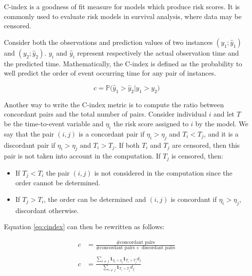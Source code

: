 \documentclass[
]{book}
\providecommand{\tightlist}{%
  \setlength{\itemsep}{0pt}\setlength{\parskip}{0pt}}
\begin{document}
C-index is a goodness of fit measure for models which produce risk scores. It is commonly used to evaluate risk models in survival analysis, where data may be censored.

Consider both the observations and prediction values of two instances \((y_1; \hat{y}_1)\) and \((y_2; \hat{y}_2)\). \(y_i\) and \(\hat{y}_i\) represent respectively the actual observation time and the predicted time. Mathematically, the C-index is defined as the probability to well predict the order of event occurring time for any pair of instances.

\begin{equation}
  c = \mathbb{P}\big(\hat{y}_1 > \hat{y}_2 | y_1 > y_2\big)
  \label{eq:cindex}
\end{equation}

Another way to write the C-index metric is to compute the ratio between concordant pairs and the total number of pairs. Consider individual \(i\) and let \(T\) be the time-to-event variable and \(\eta_i\) the risk score assigned to \(i\) by the model. We say that the pair \((i, j)\) is a concordant pair if \(\eta_i > \eta_j\) and \(T_i < T_j\), and it is a discordant pair if \(\eta_i > \eta_j\) and \(T_i > T_j\). If both \(T_i\) and \(T_j\) are censored, then this pair is not taken into account in the computation. If \(T_j\) is censored, then:

\begin{itemize}
\tightlist
\item
  If \(T_j < T_i\) the pair \((i, j)\) is not considered in the computation since the order cannot be determined.
\item
  If \(T_j > T_i\), the order can be determined and \((i, j)\) is concordant if \(\eta_i > \eta_j\), discordant otherwise.
\end{itemize}

Equation \eqref{eq:cindex} can then be rewritten as follows:

\begin{equation}
\begin{aligned}
c & = \frac{\# \text{concordant pairs}}{\# \text{concordant pairs} + \ \text{discordant pairs}} \\\\
c & = \frac{\sum_{i \neq j} \pmb{1}_{\eta_i < \eta_j} \pmb{1}_{T_i > T_j}d_j}{\sum_{i \neq j} \pmb{1}_{T_i > T_j}d_j}
\end{aligned}
\label{eq:cindex2}
\end{equation}
\end{document}
